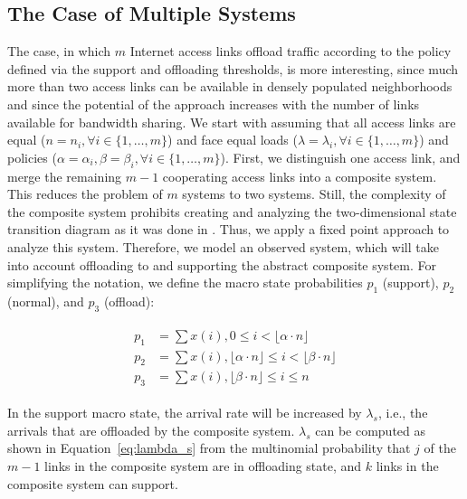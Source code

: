 \subsection{The Case of Multiple Systems}\label{sec:aggregation:performance_model:analytical_model:m_systems}

The case, in which $m$ Internet access links offload traffic according to the policy defined via the support and offloading thresholds, is more interesting, since much more than two access links can be available in densely populated neighborhoods and since the potential of the approach increases with the number of links available for bandwidth sharing.
We start with assuming that all access links are equal ($n=n_i, \forall i\in\{1,\ldots,m\}$) and face equal loads ($\lambda=\lambda_i, \forall i\in\{1,\ldots,m\}$) and policies ($\alpha = \alpha_i, \beta = \beta_i, \forall i\in\{1,\ldots,m\}$). First, we distinguish one access link, and merge the remaining $m-1$ cooperating access links into a composite system. This reduces the problem of $m$ systems to two systems. Still, the complexity of the composite system prohibits creating and analyzing the two-dimensional state transition diagram as it was done in \cite{burger2016phycom}. Thus, we apply a fixed point approach to analyze this system.%
Therefore, we model an observed system, which will take into account offloading to and supporting the abstract composite system. For simplifying the notation, we define the macro state probabilities $p_1$ (support), $p_2$ (normal), and $p_3$ (offload):

\begin{align}
\begin{split}
p_1 &= \sum x(i),  0 \leq i < \lfloor\alpha\cdot n\rfloor \\
p_2 &= \sum x(i), \lfloor\alpha\cdot n\rfloor\leq i < \lfloor\beta\cdot n\rfloor \\
p_3 &= \sum x(i), \lfloor\beta\cdot n\rfloor \leq i \leq n
\end{split}
\label{eq:macro}
\end{align}

In the support macro state, the arrival rate will be increased by $\lambda_s$, i.e., the arrivals that are offloaded by the composite system. $\lambda_s$ can be computed as shown in Equation~\ref{eq:lambda_s} from the multinomial probability that $j$ of the $m-1$ links in the composite system are in offloading state, and $k$ links in the composite system can support.

